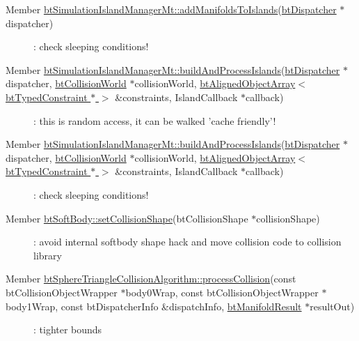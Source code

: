 \label{todo__todo000035}
\hypertarget{todo__todo000035}{}
 \begin{description}
\item[Member \hyperlink{classbt_simulation_island_manager_mt_77eadf262f5a0e63053e3efcc9ccfec9}{btSimulationIslandManagerMt::addManifoldsToIslands}(\hyperlink{classbt_dispatcher}{btDispatcher} $\ast$dispatcher) ]: check sleeping conditions! \end{description}


\label{todo__todo000036}
\hypertarget{todo__todo000036}{}
 \begin{description}
\item[Member \hyperlink{classbt_simulation_island_manager_mt_9be20c991c57ec972eb33a160d6276fd}{btSimulationIslandManagerMt::buildAndProcessIslands}(\hyperlink{classbt_dispatcher}{btDispatcher} $\ast$dispatcher, \hyperlink{classbt_collision_world}{btCollisionWorld} $\ast$collisionWorld, \hyperlink{classbt_aligned_object_array}{btAlignedObjectArray$<$ btTypedConstraint $\ast$ $>$} \&constraints, IslandCallback $\ast$callback) ]: this is random access, it can be walked 'cache friendly'! \end{description}


\label{todo__todo000036}
\hypertarget{todo__todo000036}{}
 \begin{description}
\item[Member \hyperlink{classbt_simulation_island_manager_mt_9be20c991c57ec972eb33a160d6276fd}{btSimulationIslandManagerMt::buildAndProcessIslands}(\hyperlink{classbt_dispatcher}{btDispatcher} $\ast$dispatcher, \hyperlink{classbt_collision_world}{btCollisionWorld} $\ast$collisionWorld, \hyperlink{classbt_aligned_object_array}{btAlignedObjectArray$<$ btTypedConstraint $\ast$ $>$} \&constraints, IslandCallback $\ast$callback) ]: check sleeping conditions! \end{description}


\label{todo__todo000039}
\hypertarget{todo__todo000039}{}
 \begin{description}
\item[Member \hyperlink{classbt_soft_body_ced0f5421eeb1491a3fd77bb91e2e5af}{btSoftBody::setCollisionShape}(btCollisionShape $\ast$collisionShape) ]: avoid internal softbody shape hack and move collision code to collision library \end{description}


\label{todo__todo000018}
\hypertarget{todo__todo000018}{}
 \begin{description}
\item[Member \hyperlink{classbt_sphere_triangle_collision_algorithm_f6de517d0a45abb91df4f61c5867c8f1}{btSphereTriangleCollisionAlgorithm::processCollision}(const btCollisionObjectWrapper $\ast$body0Wrap, const btCollisionObjectWrapper $\ast$body1Wrap, const btDispatcherInfo \&dispatchInfo, \hyperlink{classbt_manifold_result}{btManifoldResult} $\ast$resultOut) ]: tighter bounds \end{description}


